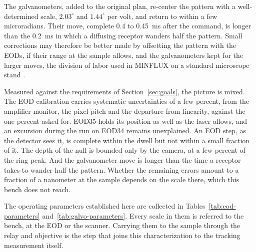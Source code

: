 \documentclass{article}
\begin{document}
The galvanometers, added to the original plan, re-center the pattern with a well-determined scale,
$2.03^\circ$ and $1.44^\circ$ per volt, and return to within a few microradians. Their move,
complete 0.4 to 0.45~ms after the command, is longer than the 0.2~ms in which a diffusing receptor
wanders half the pattern. Small corrections may therefore be better made by offsetting the pattern
with the EODs, if their range at the sample allows, and the galvanometers kept for the larger
moves, the division of labor used in MINFLUX on a standard microscope stand
\cite{schmidtMINFLUXNanometerscale3D2021}.

Measured against the requirements of Section~\ref{sec:goals}, the picture is mixed. The EOD
calibration carries systematic uncertainties of a few percent, from the amplifier monitor, the
pixel pitch and the departure from linearity, against the one percent asked for. EOD35 holds its
position as well as the laser allows, and an excursion during the run on EOD34 remains
unexplained. An EOD step, as the detector sees it, is complete within the dwell but not within a
small fraction of it. The depth of the null is bounded only by the camera, at a few percent of the
ring peak. And the galvanometer move is longer than the
time a receptor takes to wander half the pattern. Whether the remaining errors amount to a fraction
of a nanometer at the sample depends on the scale there, which this bench does not reach.

The operating parameters established here are collected in Tables~\ref{tab:eod-parameters}
and~\ref{tab:galvo-parameters}. Every scale in them is referred to the bench, at the EOD or the
scanner. Carrying them to the sample through the relay and objective is the step that joins this
characterization to the tracking measurement itself.
\end{document}
